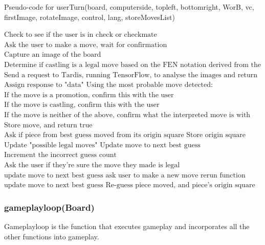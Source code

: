 \documentclass[onecolumn]{IEEEtran}
\begin{document}
\begin{algorithm}[H]
\caption{Pseudo-code for userTurn(board, computerside, topleft, bottomright, WorB, vc, firstImage, rotateImage, control, lang, storeMovesList)}
\begin{algorithmic}[1]
\STATE $\text{Check to see if the user is in check or checkmate}$
\STATE $\text{Ask the user to make a move, wait for confirmation}$
\STATE $\text{Capture an image of the board}$
\STATE $\text{Determine if castling is a legal move based on the FEN notation derived from the "board" input}$
\STATE $\text{Send a request to Tardis, running TensorFlow, to analyse the images and return expected moves}$
\STATE $\text{Assign response to "data"}$
\STATE $\text{Using the most probable move detected:}$
\STATE $\text{If the move is a promotion, confirm this with the user}$
\STATE $\text{If the move is castling, confirm this with the user}$
\STATE $\text{If the move is neither of the above, confirm what the interpreted move is with the user}$
	\STATE $\text{Store move, and return true}$
\ELSE
	\STATE $\text{Ask if piece from best guess moved from its origin square}$
			\STATE $\text{Store origin square}$
			\STATE $\text{Update "possible legal moves"}$
			\STATE $\text{Update move to next best guess}$
		\ELSE
			\STATE $\text{Increment the incorrect guess count}$
			\STATE $\text{Ask the user if they're sure the move they made is legal}$
				\STATE $\text{update move to next best guess}$
				\ELSE
				\STATE $\text{ask user to make a new move}$
				\STATE $\text{rerun function}$
				\ENDIF
			\ELSE
			\STATE $\text{update move to next best guess}$
			\STATE $\text{Re-guess piece moved, and piece's origin square}$
			\ENDIF
		\ENDIF
	\ENDIF
\ENDIF
\end{algorithmic}
\end{algorithm}

\subsubsection{gameplayloop(Board)}
Gameplayloop is the function that executes gameplay and incorporates all the other functions into gameplay. 
\end{document}
